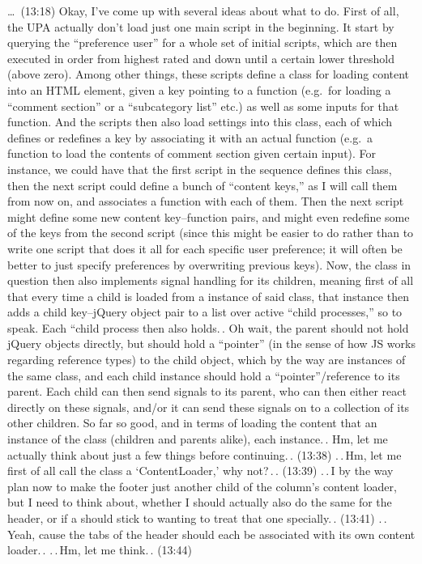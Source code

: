 \documentclass{report}
\begin{document}
\ldots\ (13:18) Okay, I've come up with several ideas about what to do. First of all, the UPA actually don't load just one main script in the beginning. It start by querying the ``preference user'' for a whole set of initial scripts, which are then executed in order from highest rated and down until a certain lower threshold (above zero). Among other things, these scripts define a class for loading content into an HTML element, given a key pointing to a function (e.g.\ for loading a ``comment section'' or a ``subcategory list'' etc.) as well as some inputs for that function. And the scripts then also load settings into this class, each of which defines or redefines a key by associating it with an actual function (e.g.\ a function to load the contents of comment section given certain input). For instance, we could have that the first script in the sequence defines this class, then the next script could define a bunch of ``content keys,'' as I will call them from now on, and associates a function with each of them. Then the next script might define some new content key--function pairs, and might even redefine some of the keys from the second script (since this might be easier to do rather than to write one script that does it all for each specific user preference; it will often be better to just specify preferences by overwriting previous keys). Now, the class in question then also implements signal handling for its children, meaning first of all that every time a child is loaded from a instance of said class, that instance then adds a child key--jQuery object pair to a list over active ``child processes,'' so to speak. Each ``child process then also holds.\,. Oh wait, the parent should not hold jQuery objects directly, but should hold a ``pointer'' (in the sense of how JS works regarding reference types) to the child object, which by the way are instances of the same class, and each child instance should hold a ``pointer''/reference to its parent. Each child can then send signals to its parent, who can then either react directly on these signals, and/or it can send these signals on to a collection of its other children.
So far so good, and in terms of loading the content that an instance of the class (children and parents alike), each instance.\,. Hm, let me actually think about just a few things before continuing.\,. (13:38) .\,.\,Hm, let me first of all call the class a `ContentLoader,' why not?\,.\,. (13:39) .\,.\,I by the way plan now to make the footer just another child of the column's content loader, but I need to think about, whether I should actually also do the same for the header, or if a should stick to wanting to treat that one specially.\,. (13:41) .\,.\,Yeah, cause the tabs of the header should each be associated with its own content loader.\,. .\,.\,Hm, let me think.\,. (13:44)
\end{document}
